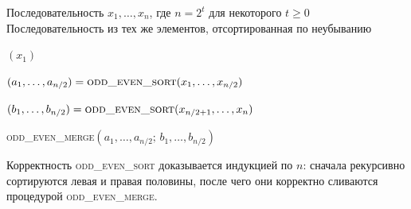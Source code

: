 \begin{algorithm}[H]
	\caption{\textsc{odd\_even\_sort}$(x_1,\dots,x_n)$}
	\begin{algorithmic}[1]
		\Require Последовательность $x_1,\dots,x_n$, где $n=2^t$ для некоторого $t \ge 0$
		\Ensure Последовательность из тех же элементов, отсортированная по неубыванию
		
		\State \Return $(x_1)$
		\EndIf
		
		\State $(a_1,\dots,a_{n/2}) = \textsc{odd\_even\_sort}(x_1,\dots,x_{n/2})$
		
		\State $(b_1,\dots,b_{n/2}) = \textsc{odd\_even\_sort}(x_{n/2+1},\dots,x_n)$
		
		\State \Return \textsc{odd\_even\_merge}$(a_1,\dots,a_{n/2};\, b_1,\dots,b_{n/2})$
	\end{algorithmic}
\end{algorithm}

\begin{Remark}{}{}
	Корректность \textsc{odd\_even\_sort} доказывается индукцией по $n$:
	сначала рекурсивно сортируются левая и правая половины, после чего они корректно сливаются процедурой \textsc{odd\_even\_merge}.
\end{Remark}
